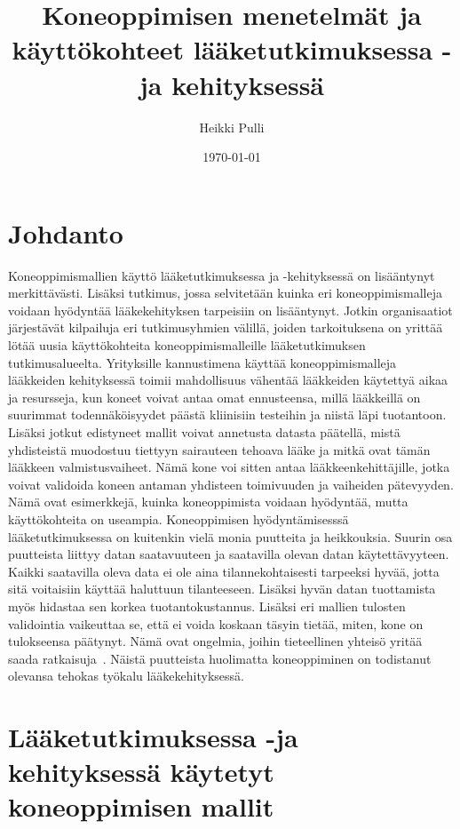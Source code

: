 \documentclass[finnish,twoside,censored,essay,sw-line]{HYthesisML}
\title{Koneoppimisen menetelmät ja käyttökohteet lääketutkimuksessa -ja kehityksessä}
\author{Heikki Pulli}
\date{\today}
\begin{document}
\maketitle

\mytableofcontents
\mainmatter

\chapter{Johdanto}

Koneoppimismallien käyttö lääketutkimuksessa ja -kehityksessä on lisääntynyt merkittävästi. Lisäksi tutkimus, jossa selvitetään kuinka eri koneoppimismalleja voidaan hyödyntää lääkekehityksen tarpeisiin on lisääntynyt.
Jotkin organisaatiot järjestävät kilpailuja eri tutkimusyhmien välillä, joiden tarkoituksena on yrittää lötää uusia käyttökohteita koneoppimismalleille lääketutkimuksen tutkimusalueelta.
Yrityksille kannustimena käyttää koneoppimismalleja lääkkeiden kehityksessä toimii mahdollisuus vähentää lääkkeiden käytettyä aikaa ja resursseja, kun koneet voivat antaa omat ennusteensa, millä lääkkeillä on
suurimmat todennäköisyydet päästä kliinisiin testeihin ja niistä läpi tuotantoon. Lisäksi jotkut edistyneet mallit voivat annetusta datasta päätellä, mistä yhdisteistä muodostuu tiettyyn sairauteen tehoava lääke
ja mitkä ovat tämän lääkkeen valmistusvaiheet. Nämä kone voi sitten antaa lääkkeenkehittäjille, jotka voivat validoida koneen antaman yhdisteen toimivuuden ja vaiheiden pätevyyden. Nämä ovat esimerkkejä, kuinka koneoppimista
voidaan hyödyntää, mutta käyttökohteita on useampia. Koneoppimisen hyödyntämisesssä lääketutkimuksessa on kuitenkin vielä monia puutteita ja heikkouksia. Suurin osa  puutteista liittyy datan saatavuuteen ja saatavilla
olevan datan käytettävyyteen. Kaikki saatavilla oleva data ei ole aina tilannekohtaisesti tarpeeksi hyvää, jotta sitä voitaisiin käyttää haluttuun tilanteeseen. Lisäksi hyvän datan tuottamista myös hidastaa sen korkea tuotantokustannus.
Lisäksi eri mallien tulosten validointia vaikeuttaa se, että ei voida koskaan täsyin tietää, miten, kone on tulokseensa päätynyt. Nämä ovat ongelmia, joihin tieteellinen yhteisö yritää saada ratkaisuja~\cite{VamathevanJessica2019Aoml}.
Näistä puutteista huolimatta koneoppiminen on todistanut olevansa tehokas työkalu lääkekehityksessä.

\chapter{Lääketutkimuksessa -ja kehityksessä käytetyt koneoppimisen mallit}
\end{document}
